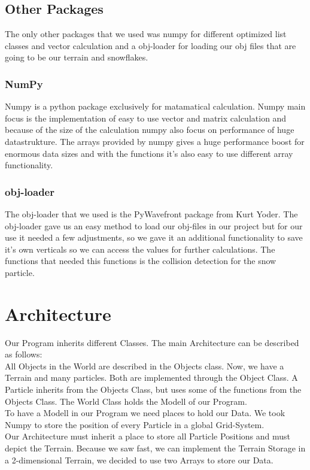 \documentclass{sig-alternate-05-2015}
\begin{document}
\subsection{Other Packages}
The only other packages that we used was numpy for different optimized list classes and vector calculation and a obj-loader for loading our obj files that are going to be our terrain and snowflakes.
\subsubsection{NumPy}
Numpy is a python package exclusively for matamatical calculation. Numpy main focus is the implementation of easy to use vector and matrix calculation and because of the size of the calculation numpy also focus on performance of huge datastrukture. The arrays provided by numpy gives a huge performance boost for enormous data sizes and with the functions it's also easy to use different array functionality.
\subsubsection{obj-loader}
The obj-loader that we used is the PyWavefront package from Kurt Yoder. The obj-loader gave us an easy method to load our obj-files in our project but for our use it needed a few adjustments, so we gave it an additional functionality to save it's own verticals so we can access the values for further calculations. The functions that needed this functions is the collision detection for the snow particle.
\section{Architecture}
Our Program inherits different Classes. The main Architecture can be described as follows:\\
All Objects in the World are described in the Objects class. Now, we have a Terrain and many particles. Both are implemented through the Object Class. A Particle inherits from the Objects Class, but uses some of the functions from the Objects Class. The World Class holds the Modell of our Program. \\
To have a Modell in our Program we need places to hold our Data. We took Numpy to store the position of every Particle in a global Grid-System.\\
Our Architecture must inherit a place to store all Particle Positions and must depict the Terrain. Because we saw fast, we can implement the Terrain Storage in a 2-dimensional Terrain, we decided to use two Arrays to store our Data. \\
\end{document}
